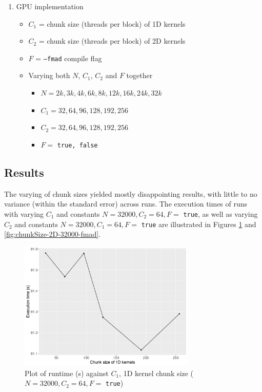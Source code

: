 \documentclass[12pt]{article}
\begin{document}
\begin{enumerate}
	\item GPU implementation
	\begin{itemize}
		\item $C_1$ = chunk size (threads per block) of 1D kernels
		\item $C_2$ = chunk size (threads per block) of 2D kernels
		\item $F$ = \texttt{--fmad} compile flag
		\item Varying both $N$, $C_1$,  $C_2$ and $F$ together
		\begin{itemize}
		    \item $N = 2k, 3k, 4k, 6k, 8k, 12k, 16k, 24k, 32k$
			\item $C_1 = 32, 64, 96, 128, 192, 256$
			\item $C_2 = 32, 64, 96, 128, 192, 256$
			\item $F =$ \texttt{true, false}
		\end{itemize}
	\end{itemize}
\end{enumerate}

\pagebreak

\subsection{Results}

The varying of chunk sizes yielded mostly disappointing results, with little to no variance (within the standard error) across runs. The execution times of runs with varying $C_1$ and constants $N = 32000, C_2 = 64, F =$ \texttt{true}, as well as varying $C_2$ and constants $N = 32000, C_1 = 64, F =$ \texttt{true} are illustrated in Figures \ref{fig:chunkSize-1D-32000-fmad} and \ref{fig:chunkSize-2D-32000-fmad}.

\begin{figure}[H]
    \centering
    \includegraphics[width=0.75\textwidth]{chunkSize-1D-32000-fmad}
    \caption{Plot of runtime (s) against $C_1$, 1D kernel chunk size ($N = 32000, C_2 = 64, F =$ \texttt{true})}
    \label{fig:chunkSize-1D-32000-fmad}
\end{figure}
\end{document}
